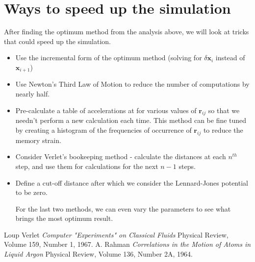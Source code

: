 \documentclass[a4paper, 12pt]{article}
\renewcommand{\vec}[1]{\mathbf{#1}}
\begin{document}
	\section{Ways to speed up the simulation}
	After finding the optimum method from the analysis above, we will look at tricks that could speed up the simulation.
\begin{itemize}
	\item Use the incremental form of the optimum method (solving for $\delta \vec{x}_{i}$ instead of $\vec{x}_{i+1}$)
	\item Use Newton's Third Law of Motion to reduce the number of computations by nearly half.
	\item Pre-calculate a table of accelerations at for various values of $\vec{r}_{ij}$ so that we needn't perform a new calculation each time. This method can be fine tuned by creating a histogram of the frequencies of occurrence of $\vec{r}_{ij}$ to reduce the memory strain.
	\item Consider Verlet's bookeeping method \cite{Verlet1967} - calculate the distances at each $n^{th}$ step, and use them for calculations for the next $n-1$ steps.
	\item Define a cut-off distance after which we consider the Lennard-Jones potential to be zero.

For the last two methods, we can even vary the parameters to see what brings the most optimum result.  
\end{itemize}
\begin{thebibliography}{10}
		{\sc Loup Verlet}
		{\it Computer "Experiments" on Classical Fluids}
		Physical Review, Volume 159, Number 1, 1967.
		{\sc A. Rahman}
		{\it Correlations in the Motion of Atoms in Liquid Argon}
		Physical Review, Volume 136, Number 2A, 1964.
\end{thebibliography}
\end{document}
